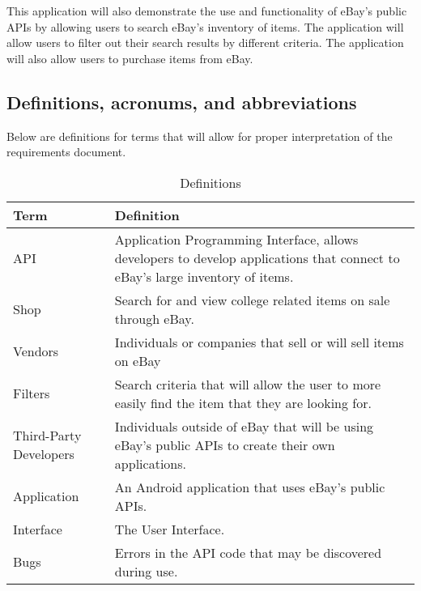 \documentclass[journal,compsoc, 10pt, draftclsnofoot, onecolumn]{IEEEtran}
\begin{document}
This application will also demonstrate the use and functionality of eBay's 
public APIs by allowing users to search eBay's inventory of items. The 
application will allow users to filter out their search results by different 
criteria. The application will also allow users to purchase items from eBay. 

\subsection{Definitions, acronums, and abbreviations}

Below are definitions for terms that will allow for proper interpretation of the
 requirements document.

\begin{table}[]
\centering
\caption{Definitions}
\label{my-label}
\begin{tabularx}{\textwidth}{X|X}
\hline
\textbf{Term}               & \textbf{Definition}                                                                                                           \\ \hline
API                    	      & Application Programming Interface, allows developers to develop applications that connect to eBay's large inventory of items. \\ \hline
Shop                   	      & Search for and view college related items on sale through eBay.                                                               \\ \hline
Vendors               	      & Individuals or companies that sell or will sell items on eBay                                                                 \\ \hline
Filters                	      & Search criteria that will allow the user to more easily find the item that they are looking for.                              \\ \hline
Third-Party Developers & Individuals outside of eBay that will be using eBay's public APIs to create their own applications.                           \\ \hline
Application            	      & An Android application that uses eBay's public APIs.                                                                          \\ \hline
Interface              	      & The User Interface.                                                                                                           \\ \hline
Bugs                   	      & Errors in the API code that may be discovered during use.                                                                     \\ \hline

\end{tabularx}
\end{table}
\end{document}
